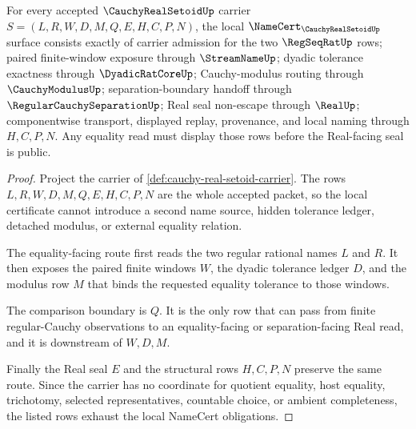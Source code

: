 \begin{theorem}
\label{thm:cauchy-real-setoid-namecert-obligations}
For every accepted $\CauchyRealSetoidUp$ carrier $S=(L,R,W,D,M,Q,E,H,C,P,N)$, the local $\NameCert_{\CauchyRealSetoidUp}$ surface consists exactly of carrier admission for the two $\RegSeqRatUp$ rows; paired finite-window exposure through $\StreamNameUp$; dyadic tolerance exactness through $\DyadicRatCoreUp$; Cauchy-modulus routing through $\CauchyModulusUp$; separation-boundary handoff through $\RegularCauchySeparationUp$; Real seal non-escape through $\RealUp$; componentwise transport, displayed replay, provenance, and local naming through $H,C,P,N$. Any equality read must display those rows before the Real-facing seal is public.
\end{theorem}
\begin{proof}
Project the carrier of \autoref{def:cauchy-real-setoid-carrier}. The rows $L,R,W,D,M,Q,E,H,C,P,N$ are the whole accepted packet, so the local certificate cannot introduce a second name source, hidden tolerance ledger, detached modulus, or external equality relation.

The equality-facing route first reads the two regular rational names $L$ and $R$. It then exposes the paired finite windows $W$, the dyadic tolerance ledger $D$, and the modulus row $M$ that binds the requested equality tolerance to those windows.

The comparison boundary is $Q$. It is the only row that can pass from finite regular-Cauchy observations to an equality-facing or separation-facing Real read, and it is downstream of $W,D,M$.

Finally the Real seal $E$ and the structural rows $H,C,P,N$ preserve the same route. Since the carrier has no coordinate for quotient equality, host equality, trichotomy, selected representatives, countable choice, or ambient completeness, the listed rows exhaust the local NameCert obligations.
\end{proof}

